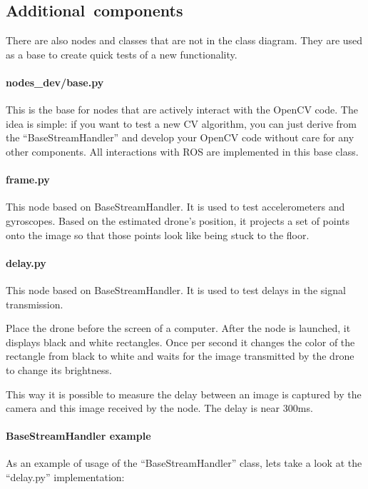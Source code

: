 \documentclass[12pt]{article}
\begin{document}
    \subsection{Additional~components}

    There are also nodes and classes that are not in the class diagram.
    They are used as a base to create quick tests of a new functionality.

    \paragraph{nodes\_dev/base.py} This is the base for nodes that are
    actively interact with the OpenCV code. The idea is simple: if you want
    to test a new CV algorithm, you can just derive from the
    ``BaseStreamHandler'' and develop your OpenCV code without care for any
    other components. All interactions with ROS are implemented in this
    base class.

    \paragraph{frame.py} This node based on BaseStreamHandler.
    It is used to test accelerometers and gyroscopes. Based on the
    estimated drone's position, it projects a set
    of points onto the image so that those points look like being stuck to the floor.

    \paragraph{delay.py} This node based on BaseStreamHandler.
    It is used to test delays in the signal transmission.

    Place the drone before the screen of a computer. After the node
    is launched, it displays black and white rectangles. Once per second
    it changes the color of the rectangle from black to white
    and waits for the image transmitted by the drone to change its brightness.

    This way it is possible to measure the delay between an image is captured
    by the camera and this image received by the node.
    The delay is near 300ms.

    \paragraph{BaseStreamHandler example}
    As an example of usage of the ``BaseStreamHandler'' class, lets
    take a look at the ``delay.py'' implementation:
\end{document}
